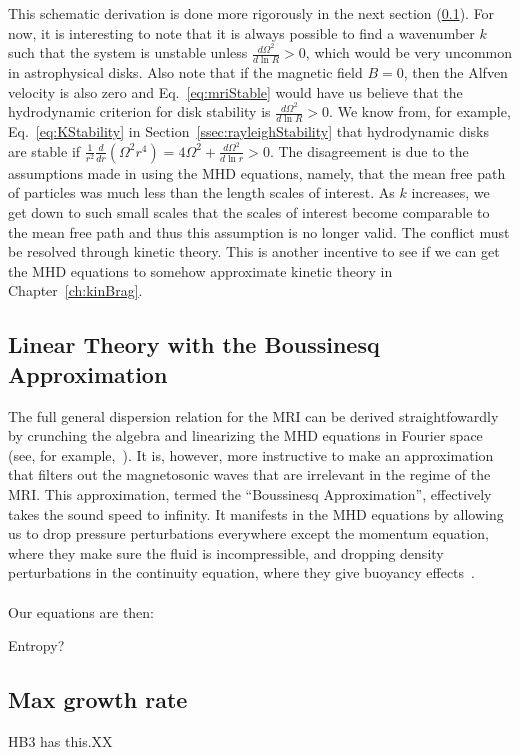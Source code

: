 This schematic derivation is done more rigorously in the next section (\ref{ssec:mriLinear}). For now, it is interesting to note that it is always possible to find a wavenumber $k$ such that the system is unstable unless $\frac{d\Omega^2}{d\ln R}>0$, which would be very uncommon in astrophysical disks. Also note that if the magnetic field $B=0$, then the Alfven velocity is also zero and Eq.~\ref{eq:mriStable} would have us believe that the hydrodynamic criterion for disk stability is $\frac{d\Omega^2}{d\ln R}>0$. We know from, for example, Eq.~\ref{eq:KStability} in Section~\ref{ssec:rayleighStability} that hydrodynamic disks are stable if $\frac1{r^2}\frac{d}{dr}(\Omega^2r^4)=4\Omega^2+\frac{d\Omega^2}{d\ln r}>0$. The disagreement is due to the assumptions made in using the MHD equations, namely, that the mean free path of particles was much less than the length scales of interest. As $k$ increases, we get down to such small scales that the scales of interest become comparable to the mean free path and thus this assumption is no longer valid. The conflict must be resolved through kinetic theory. This is another incentive to see if we can get the MHD equations to somehow approximate kinetic theory in Chapter~\ref{ch:kinBrag}.

\subsection{Linear Theory with the Boussinesq Approximation}\label{ssec:mriLinear}
The full general dispersion relation for the MRI can be derived straightfowardly by crunching the algebra and linearizing the MHD equations in Fourier space (see, for example,~\cite{BH1991a}). It is, however, more instructive to make an approximation that filters out the magnetosonic waves that are irrelevant in the regime of the MRI. This approximation, termed the ``Boussinesq Approximation'', effectively takes the sound speed to infinity. It manifests in the MHD equations by allowing us to drop pressure perturbations everywhere except the momentum equation, where they make sure the fluid is incompressible, and dropping density perturbations in the continuity equation, where they give buoyancy effects~\cite{KunzBoussNotes}.\\
\\
Our equations are then:

Entropy? 

\subsection{Max growth rate}
HB3 has this.XX


